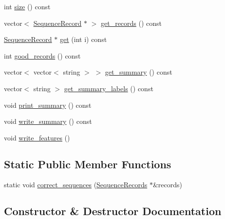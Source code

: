 \begin{DoxyCompactItemize}
\item 
int \mbox{\hyperlink{classerrorx_1_1_sequence_records_a3b041b598ce45a217ea229cc5632cc8d}{size}} () const
\item 
vector$<$ \mbox{\hyperlink{classerrorx_1_1_sequence_record}{Sequence\+Record}} $\ast$ $>$ \mbox{\hyperlink{classerrorx_1_1_sequence_records_a9242317332845a8795864556c72ff1e3}{get\+\_\+records}} () const
\item 
\mbox{\hyperlink{classerrorx_1_1_sequence_record}{Sequence\+Record}} $\ast$ \mbox{\hyperlink{classerrorx_1_1_sequence_records_a368bff7f01e34b2d6eedd14c8995d9be}{get}} (int i) const
\item 
int \mbox{\hyperlink{classerrorx_1_1_sequence_records_aa857b90f35804c6f6e179c18033ad838}{good\+\_\+records}} () const
\item 
vector$<$ vector$<$ string $>$ $>$ \mbox{\hyperlink{classerrorx_1_1_sequence_records_a426a62dad84bd4fe3a94a955c7b92330}{get\+\_\+summary}} () const
\item 
vector$<$ string $>$ \mbox{\hyperlink{classerrorx_1_1_sequence_records_a9b65dacacd35715b0ee039843d7d40d0}{get\+\_\+summary\+\_\+labels}} () const
\item 
void \mbox{\hyperlink{classerrorx_1_1_sequence_records_a9bfd2cd859cbdedec5b77c90fd4cbd36}{print\+\_\+summary}} () const
\item 
void \mbox{\hyperlink{classerrorx_1_1_sequence_records_a452c742e8e8b5d2439f2a4de906bd5b7}{write\+\_\+summary}} () const
\item 
void \mbox{\hyperlink{classerrorx_1_1_sequence_records_a7424dd4c03a2f1f4c05307dcd5e5e347}{write\+\_\+features}} ()
\end{DoxyCompactItemize}
\subsection*{Static Public Member Functions}
\begin{DoxyCompactItemize}
\item 
static void \mbox{\hyperlink{classerrorx_1_1_sequence_records_a6df0d323bdcb6f6f570e28fbdf2b6b34}{correct\+\_\+sequences}} (\mbox{\hyperlink{classerrorx_1_1_sequence_records}{Sequence\+Records}} $\ast$\&records)
\end{DoxyCompactItemize}


\subsection{Constructor \& Destructor Documentation}
\mbox{\label{classerrorx_1_1_sequence_records_a0fac9e704c40af45faef33a51b1e160d}} 
